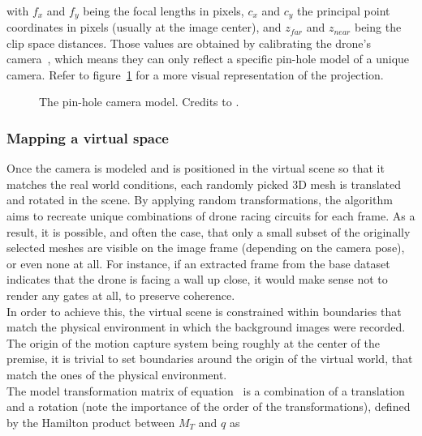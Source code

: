 ~\\with $f_x$ and $f_y$ being the focal lengths in pixels, $c_x$ and $c_y$ the
principal point coordinates in pixels (usually at the image center), and
$z_{far}$ and $z_{near}$ being the clip space distances. Those values are
obtained by calibrating the drone's camera~\cite{OpenCVCalibration}, which
means they can only reflect a specific pin-hole model of a unique camera. Refer
to figure~\ref{fig:pinholemodel} for a more visual representation of the
projection.

\begin{figure}[h]
	\center
	\resizebox{350pt}{!}{
		
	}
	\caption[Pin-hole camera model]{The pin-hole camera model. Credits to
	\cite{cfr}.}
	\label{fig:pinholemodel}
\end{figure}


	\subsubsection{Mapping a virtual space}

Once the camera is modeled and is positioned in the virtual scene so
that it matches the real world conditions, each randomly picked 3D mesh is
translated and rotated in the scene. By applying random transformations, the
algorithm aims to recreate unique combinations of drone racing circuits for
each frame. As a result, it is possible, and often the case, that only a small
subset of the originally selected meshes are visible on the image frame
(depending on the camera pose), or even none at all. For instance, if an
extracted frame from the base dataset indicates that the drone is facing a wall
up close, it would make sense not to render any gates at all, to preserve
coherence.\\

In order to achieve this, the virtual scene is constrained within boundaries
that match the physical environment in which the background images were
recorded. The origin of the motion capture system being roughly at the center
of the premise, it is trivial to set boundaries around the origin of the
virtual world, that match the ones of the physical environment.\\

The model transformation matrix of equation~ is a
combination of a translation and a rotation (note the importance of the order
of the transformations), defined by the Hamilton product between $M_T$ and $q$
as

